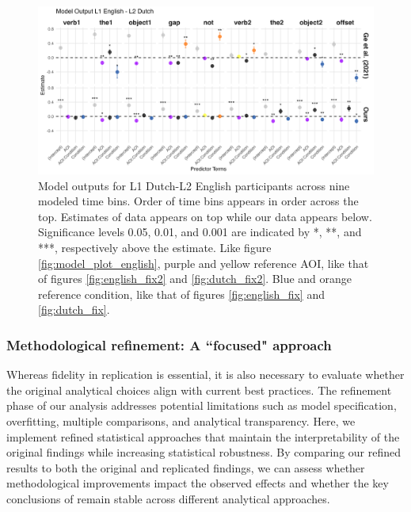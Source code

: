 \begin{figure}[H]  %
    \centering
    \includegraphics[width=\textwidth,height=\textheight,keepaspectratio]{viz/model_plot_dutch.png}
    \caption{Model outputs for L1 Dutch-L2 English participants across nine modeled time bins. Order of time bins appears in order across the top. Estimates of \cite{ge2021a} data appears on top while our data appears below. Significance levels 0.05, 0.01, and 0.001 are indicated by *, **, and ***, respectively above the estimate. Like figure \ref{fig:model_plot_english}, purple and yellow reference AOI, like that of figures \ref{fig:english_fix2} and \ref{fig:dutch_fix2}. Blue and orange reference condition, like that of figures \ref{fig:english_fix} and \ref{fig:dutch_fix}.}
    \label{fig:model_plot_dutch}
\end{figure}





\subsubsection{Methodological refinement: A ``focused" approach}

Whereas fidelity in replication is essential, it is also necessary to evaluate whether the original analytical choices align with current best practices. The refinement phase of our analysis addresses potential limitations such as model specification, overfitting, multiple comparisons, and analytical transparency. Here, we implement refined statistical approaches that maintain the interpretability of the original findings while increasing statistical robustness. By comparing our refined results to both the original and replicated findings, we can assess whether methodological improvements impact the observed effects and whether the key conclusions of \cite{ge2021a} remain stable across different analytical approaches.

